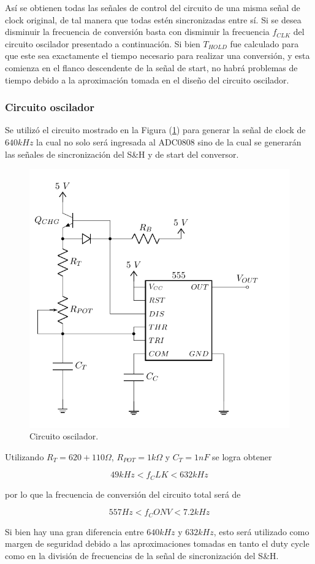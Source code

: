 Así se obtienen todas las señales de control del circuito de una misma señal de clock original, de tal manera que todas estén sincronizadas entre sí. Si se desea disminuir la frecuencia de conversión basta con disminuir la frecuencia $f_{CLK}$ del circuito oscilador presentado a continuación. Si bien $T_{HOLD}$ fue calculado para que este sea exactamente el tiempo necesario para realizar una conversión, y esta comienza en el flanco descendente de la señal de start, no habrá problemas de tiempo debido a la aproximación tomada en el diseño del circuito oscilador.

\subsubsection{Circuito oscilador}

Se utilizó el circuito mostrado en la Figura (\ref{555}) para generar la señal de clock de $640kHz$ la cual no solo será ingresada al ADC0808 sino de la cual se generarán las señales de sincronización del S\&H y de start del conversor.

\begin{figure}[H]
\centering
\includegraphics[width=0.6\linewidth, page=1]{ImagenesEjercicio1/Components.pdf}
\caption{Circuito oscilador.}
\label{555}
\end{figure}

Utilizando $R_{T} = 620 + 110\Omega$, $R_{POT} = 1k\Omega$ y $C_{T} = 1nF$ se logra obtener

\[ 49kHz < f_CLK < 632kHz\]

por lo que la frecuencia de conversión del circuito total será de

\[ 557Hz < f_CONV < 7.2kHz \]

Si bien hay una gran diferencia entre $640kHz$ y $632kHz$, esto será utilizado como margen de seguridad debido a las aproximaciones tomadas en tanto el duty cycle como en la división de frecuencias de la señal de sincronización del S\&H.

